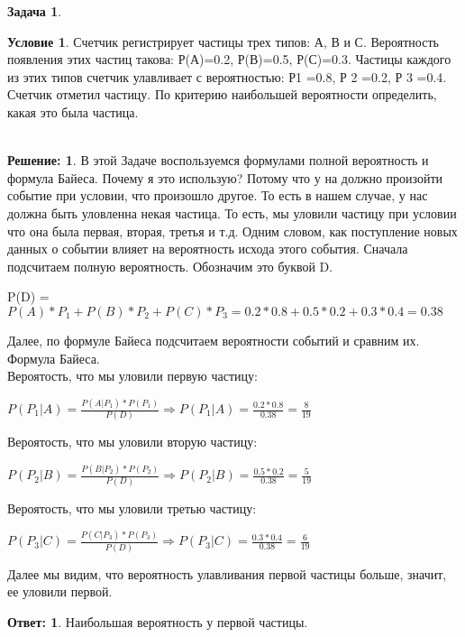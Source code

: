 \documentclass[amstex,11pt,a4paper]{article}
\theoremstyle{definition}
\newtheorem{ex}[problem]{Задача}
\newtheorem{disc}{Условие}
\newtheorem{resh}{Решение:}
\newtheorem{answer}{Ответ:}
\begin{document}
\begin{ex}
\begin{disc}
    Счетчик регистрирует частицы трех типов: А, В и С. Вероятность
появления этих частиц такова: Р(А)=0.2, Р(В)=0.5, Р(С)=0.3. Частицы каждого из этих
типов счетчик улавливает с вероятностью: Р1 =0.8, Р 2 =0.2, Р 3 =0.4. Счетчик отметил
частицу. По критерию наибольшей вероятности определить, какая это была частица.
\\
\\
\begin{resh}
    В этой Задаче воспользуемся формулами полной вероятность и формула Байеса. Почему я это использую? Потому что у на должно произойти событие при условии, что произошло другое. То есть в нашем случае, у нас должна быть уловленна некая частица. То есть, мы уловили частицу при условии что она была первая, вторая, третья и т.д. Одним словом, как поступление новых данных о событии влияет на вероятность исхода этого события.
    Сначала подсчитаем полную вероятность. Обозначим это буквой D.
    \begin{center}
    P(D) = $P(A) * P_1 + P(B) * P_2 + P(C) * P_3 = 0.2 * 0.8 + 0.5 * 0.2 + 0.3 * 0.4 = 0.38$
    \end{center}
    Далее, по формуле Байеса подсчитаем вероятности событий и сравним их.
    Формула Байеса.\\ 
    Вероятость, что мы уловили первую частицу: 
    \begin{center}
    $P(P_1|A) = \frac{P(A|P_1) * P(P_1)}{P(D)} \Rightarrow P(P_1|A) = \frac{0.2 * 0.8}{0.38} = \frac{8}{19}$ 
    \end{center}
    Вероятость, что мы уловили вторую частицу: 
    \begin{center}
    $P(P_2|B) = \frac{P(B|P_2) * P(P_2)}{P(D)} \Rightarrow P(P_2|B) = \frac{0.5 * 0.2}{0.38} = \frac{5}{19}$ 
    \end{center}
    Вероятость, что мы уловили третью частицу: 
    \begin{center}
    $P(P_3|C) = \frac{P(C|P_3) * P(P_3)}{P(D)} \Rightarrow P(P_3|C) = \frac{0.3 * 0.4}{0.38} = \frac{6}{19}$ 
    \end{center}
    Далее мы видим, что вероятность улавливания первой частицы больше, значит, ее уловили первой.
    \begin{answer}
        Наибольшая вероятность у первой частицы.
    \end{answer}
\end{resh}
\end{disc}
\end{ex}
\end{document}
